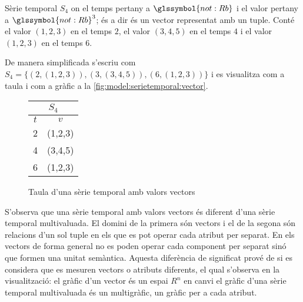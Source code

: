 \begin{example}
  Sèrie temporal $S_4$ on el temps pertany a $\glssymbol{not:Rb}$ i el valor
  pertany a $\glssymbol{not:Rb}^3$; és a dir és un vector representat amb un
  tuple. Conté el valor $(1,2,3)$ en el temps $2$, el valor $(3,4,5)$
  en el temps $4$ i el valor $(1,2,3)$ en el temps $6$.

De manera simplificada s'escriu com $S_4 = \{ (2,(1,2,3)),
(3,(3,4,5)), (6,(1,2,3)) \}$ i es visualitza com a taula i com a
gràfic a la \autoref{fig:model:serietemporal:vector}.

\begin{figure}[tp]
  \centering
  \begin{tabular}{|c|c|}
    \multicolumn{2}{c}{$S_4$} \\ \hline
    $t$  & $v$ \\ \hline
    2  & (1,2,3) \\
    4  & (3,4,5) \\
    6  & (1,2,3) \\ \hline
  \end{tabular} \qquad
    \caption{Taula d'una sèrie temporal amb valors vectors}
  \label{fig:model:serietemporal:vector}
\end{figure}



S'observa que una sèrie temporal amb valors vectors és diferent d'una
sèrie temporal multivaluada. El domini de la primera són vectors i el
de la segona són relacions d'un sol tuple en els que es pot operar
cada atribut per separat. En els vectors de forma general no es poden
operar cada component per separat sinó que formen una unitat
semàntica. Aquesta diferència de significat prové de si es considera
que es mesuren vectors o atributs diferents, el qual s'observa en la
visualització: el gràfic d'un vector és un espai $R^n$ en canvi el
gràfic d'una sèrie temporal multivaluada és un multigràfic, un gràfic
per a cada atribut.

\end{example}


